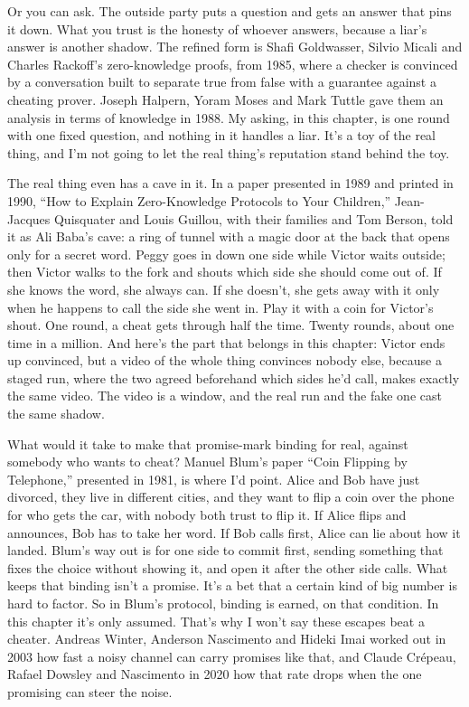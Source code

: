 \documentclass[11pt,twoside]{article}
\theoremstyle{thielethm}
\theoremstyle{thieledef}
\theoremstyle{thieledef}
\theoremstyle{thieledef}
\theoremstyle{thielethm}
\theoremstyle{thieleobs}
\theoremstyle{thielethm}
\begin{document}
Or you can ask. The outside party puts a question and gets an answer that pins it down. What you trust is the honesty of whoever answers, because a liar's answer is another shadow. The refined form is Shafi Goldwasser, Silvio Micali and Charles Rackoff's zero-knowledge proofs, from 1985, where a checker is convinced by a conversation built to separate true from false with a guarantee against a cheating prover. Joseph Halpern, Yoram Moses and Mark Tuttle gave them an analysis in terms of knowledge in 1988. My asking, in this chapter, is one round with one fixed question, and nothing in it handles a liar. It's a toy of the real thing, and I'm not going to let the real thing's reputation stand behind the toy.

The real thing even has a cave in it. In a paper presented in 1989 and printed in 1990, ``How to Explain Zero-Knowledge Protocols to Your Children,'' Jean-Jacques Quisquater and Louis Guillou, with their families and Tom Berson, told it as Ali Baba's cave: a ring of tunnel with a magic door at the back that opens only for a secret word. Peggy goes in down one side while Victor waits outside; then Victor walks to the fork and shouts which side she should come out of. If she knows the word, she always can. If she doesn't, she gets away with it only when he happens to call the side she went in. Play it with a coin for Victor's shout. One round, a cheat gets through half the time. Twenty rounds, about one time in a million. And here's the part that belongs in this chapter: Victor ends up convinced, but a video of the whole thing convinces nobody else, because a staged run, where the two agreed beforehand which sides he'd call, makes exactly the same video. The video is a window, and the real run and the fake one cast the same shadow.

What would it take to make that promise-mark binding for real, against somebody who wants to cheat? Manuel Blum's paper ``Coin Flipping by Telephone,'' presented in 1981, is where I'd point. Alice and Bob have just divorced, they live in different cities, and they want to flip a coin over the phone for who gets the car, with nobody both trust to flip it. If Alice flips and announces, Bob has to take her word. If Bob calls first, Alice can lie about how it landed. Blum's way out is for one side to commit first, sending something that fixes the choice without showing it, and open it after the other side calls. What keeps that binding isn't a promise. It's a bet that a certain kind of big number is hard to factor. So in Blum's protocol, binding is earned, on that condition. In this chapter it's only assumed. That's why I won't say these escapes beat a cheater. Andreas Winter, Anderson Nascimento and Hideki Imai worked out in 2003 how fast a noisy channel can carry promises like that, and Claude Crépeau, Rafael Dowsley and Nascimento in 2020 how that rate drops when the one promising can steer the noise.
\end{document}
